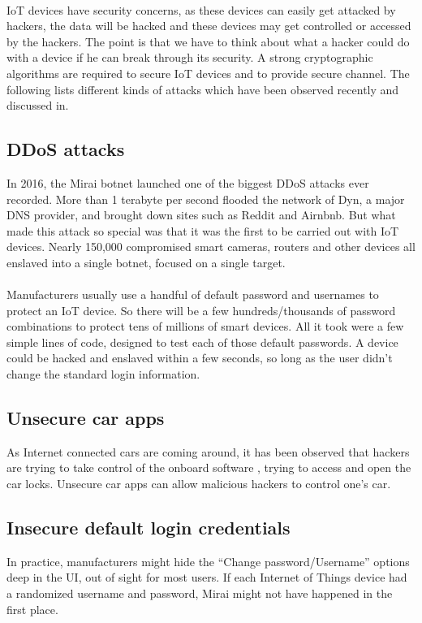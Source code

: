 \paragraph{}IoT devices have security concerns, as these devices can easily get attacked by hackers, the data will be
hacked and these devices may get controlled or accessed
by the hackers. The point is that we have to think about
what a hacker could do with a device if he can break
through its security. A strong cryptographic algorithms
are required to secure IoT devices and to provide secure
channel. The following lists different kinds of attacks
which have been observed recently and discussed in.
\subsection{DDoS attacks}
In 2016, the Mirai botnet launched one of the
biggest DDoS attacks ever recorded. More than 1
terabyte per second flooded the network of Dyn, a
major DNS provider, and brought down sites such as
Reddit and Airnbnb. But what made this attack so
special was that it was the first to be carried out with
IoT devices. Nearly 150,000 compromised smart
cameras, routers and other devices all enslaved into a
single botnet, focused on a single target.
\paragraph{}Manufacturers usually use a handful of default
password and usernames to protect an IoT device. So
there will be a few hundreds/thousands of password
combinations to protect tens of millions of smart
devices. All it took were a few simple lines of code,
designed to test each of those default passwords. A
device could be hacked and enslaved within a few
seconds, so long as the user didn’t change the standard
login information.
\subsection{ Unsecure car apps }
As Internet connected cars are coming around, it has
been observed that hackers are trying to take control of
the onboard software , trying to access and open the car
locks. Unsecure car apps can allow malicious
hackers to control one’s car.
\subsection{ Insecure default login credentials}
In practice, manufacturers might hide the “Change
password/Username” options deep in the UI, out of
sight for most users. If each Internet of Things device
had a randomized username and password, Mirai might
not have happened in the first place.
